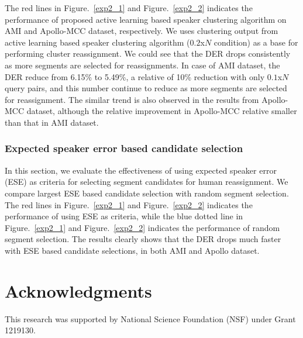 \documentclass[journal]{IEEEtran}
\begin{document}
The red lines in Figure.~\ref{exp2_1} and Figure.~\ref{exp2_2} indicates the performance of proposed active learning based speaker clustering algorithm on AMI and Apollo-MCC dataset, respectively. We uses clustering output from active learning based speaker clustering algorithm ($0.2$x$N$ condition) as a base for performing cluster reassignment. We could see that the DER drops consistently as more segments are selected for reassignments. In case of AMI dataset, the DER reduce from 6.15\% to 5.49\%, a relative of 10\% reduction with only $0.1$x$N$ query pairs, and this number continue to reduce as more segments are selected for reassignment. The similar trend is also observed in the results from Apollo-MCC dataset, although the relative improvement in Apollo-MCC relative smaller than that in AMI dataset.

\subsubsection{Expected speaker error based candidate selection}
In this section, we evaluate the effectiveness of using expected speaker error (ESE) as criteria for selecting segment candidates for human reassignment. We compare largest ESE based candidate selection with random segment selection. The red lines in Figure.~\ref{exp2_1} and Figure.~\ref{exp2_2} indicates the performance of using ESE as criteria, while the blue dotted line in Figure.~\ref{exp2_1} and Figure.~\ref{exp2_2} indicates the performance of random segment selection. The results clearly shows that the DER drops much faster with ESE based candidate selections, in both AMI and Apollo dataset.

\section*{Acknowledgments}
This research was supported by National Science Foundation (NSF) under Grant 1219130.
 






\ifCLASSOPTIONcaptionsoff
  \newpage
\fi



\end{document}
